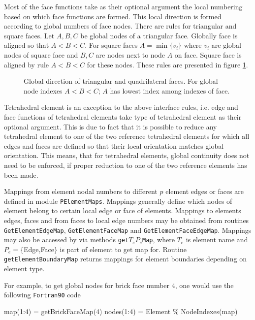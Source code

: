 Most of the face functions take as their optional argument the local numbering based on which face functions are formed. This local direction is formed according to global numbers of face nodes. There are rules for triangular and square faces. Let $A,B,C$ be global nodes of a triangular face. Globally face is aligned so that $A<B<C$. For square faces $A=\min\{v_i\}$ where $v_i$ are global nodes of square face and $B,C$ are nodes next to node $A$ on face. Square face is aligned by rule $A<B<C$ for these nodes. These rules are presented in figure \ref{fig:parityqt}.

\begin{figure}[tbhp]
\begin{center}
\label{fig:parityqt}

\end{center}
\caption{Global direction of triangular and quadrilateral faces. For global node indexes $A<B<C$; $A$ has lowest index among indexes of face.}
\end{figure}

Tetrahedral element is an exception to the above interface rules, i.e. edge and face functions of tetrahedral elements take type of tetrahedral element as their optional argument. This is due to fact that it is possible to reduce any tetrahedral element to one of the two reference tetrahedral elements for which all edges and faces are defined so that their local orientation matches global orientation. This means, that for tetrahedral elements, global continuity does not need to be enforced, if proper reduction to one of the two reference elements has been made. 

Mappings from element nodal numbers to different $p$ element edges or faces are defined in module \texttt{PElementMaps}. Mappings generally define which nodes of element belong to certain local edge or face of elements. Mappings to elements edges, faces and from faces to local edge numbers may be obtained from routines \texttt{GetElementEdgeMap}, \texttt{GetElementFaceMap} and \texttt{GetElementFaceEdgeMap}. Mappings may also be accessed by via methods \texttt{get}$T_e$$P_e$\texttt{Map}, where $T_e$ is element name and $P_e=\{$Edge,Face$\}$ is part of element to get map for. Routine \texttt{getElementBoundaryMap} returns mappings for element boundaries depending on element type. 

For example, to get global nodes for brick face number $4$, one would use the following \texttt{Fortran90} code

\ttbegin
map(1:4) = getBrickFaceMap(4)
nodes(1:4) = Element \% NodeIndexes(map)
\ttend

